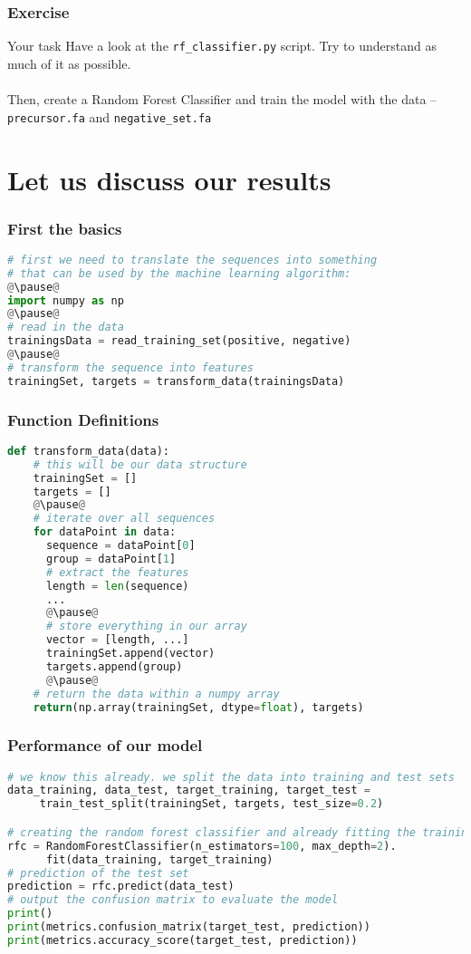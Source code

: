 \begin{frame}[c]\frametitle{Exercise}
  \pause
  \begin{block}{Your task}
    Have a look at the \texttt{rf\_classifier.py} script. Try to understand as much of it as possible.\\ \ \\
    Then, create a Random Forest Classifier and train the model with the data -- \texttt{precursor.fa} and \texttt{negative\_set.fa}
  \end{block}
\end{frame}

\section[Discussion]{Let us discuss our results}

\begin{frame}[c,fragile]\frametitle{First the basics}
  \begin{lstlisting}[language=Python]
# first we need to translate the sequences into something
# that can be used by the machine learning algorithm:
@\pause@
import numpy as np
@\pause@
# read in the data
trainingsData = read_training_set(positive, negative)
@\pause@
# transform the sequence into features
trainingSet, targets = transform_data(trainingsData)
  \end{lstlisting}
\end{frame}

\begin{frame}[c,fragile]\frametitle{Function Definitions}
  \begin{lstlisting}[language=Python]
def transform_data(data):
    # this will be our data structure
    trainingSet = []
    targets = []
    @\pause@
    # iterate over all sequences
    for dataPoint in data:
      sequence = dataPoint[0]
      group = dataPoint[1]
      # extract the features
      length = len(sequence)
      ...  
      @\pause@
      # store everything in our array
      vector = [length, ...]
      trainingSet.append(vector)
      targets.append(group)
      @\pause@
    # return the data within a numpy array
    return(np.array(trainingSet, dtype=float), targets)
  \end{lstlisting}
\end{frame}

\begin{frame}[c, fragile]\frametitle{Performance of our model}
  \begin{lstlisting}[language=Python]
# we know this already. we split the data into training and test sets
data_training, data_test, target_training, target_test = 
     train_test_split(trainingSet, targets, test_size=0.2)

# creating the random forest classifier and already fitting the training data
rfc = RandomForestClassifier(n_estimators=100, max_depth=2).
      fit(data_training, target_training)
# prediction of the test set
prediction = rfc.predict(data_test)
# output the confusion matrix to evaluate the model
print()
print(metrics.confusion_matrix(target_test, prediction))
print(metrics.accuracy_score(target_test, prediction))
  \end{lstlisting}
\end{frame}

